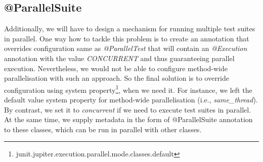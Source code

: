 \subsection{@ParallelSuite}
\label{05:parallelsuite}

Additionally, we will have to design a mechanism for running multiple test suites in parallel.
One way how to tackle this problem is to create an annotation that overrides configuration same as \emph{@ParallelTest}
that will contain an \emph{@Execution} annotation with the value \emph{CONCURRENT} and thus guaranteeing parallel execution.
Nevertheless, we would not be able to configure method-wide parallelisation with such an approach.
So the final solution is to override configuration using system property\footnote{junit.jupiter.execution.parallel.mode.classes.default},
when we need it.
For instance, we left the default value system property for method-wide parallelisation (i.e., \emph{same\_thread}).
By contrast, we set it to \emph{concurrent} if we need to execute test suites in parallel.
At the same time, we supply metadata in the form of @ParallelSuite annotation to these classes, which can be run in parallel with other classes.